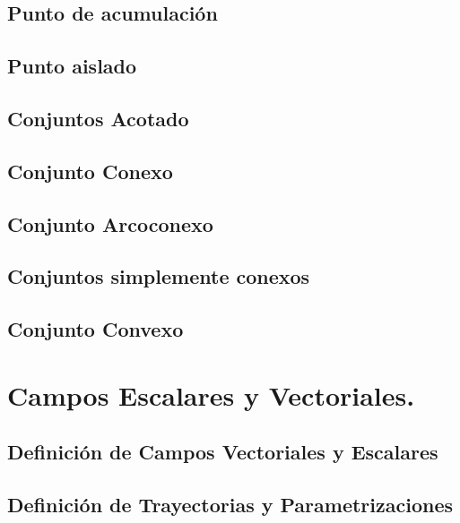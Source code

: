 \documentclass{report}
\begin{document}
\section{Punto de acumulación}



\section{Punto aislado}


\section{Conjuntos Acotado}



\section{Conjunto Conexo}




\section{Conjunto Arcoconexo}



\section{Conjuntos simplemente conexos}



\section{Conjunto  Convexo}








\chapter{Campos Escalares y Vectoriales.}
         
\section{Definici\'on de Campos Vectoriales y Escalares}

    \section{Definici\'on de Trayectorias y Parametrizaciones}

\end{document}
